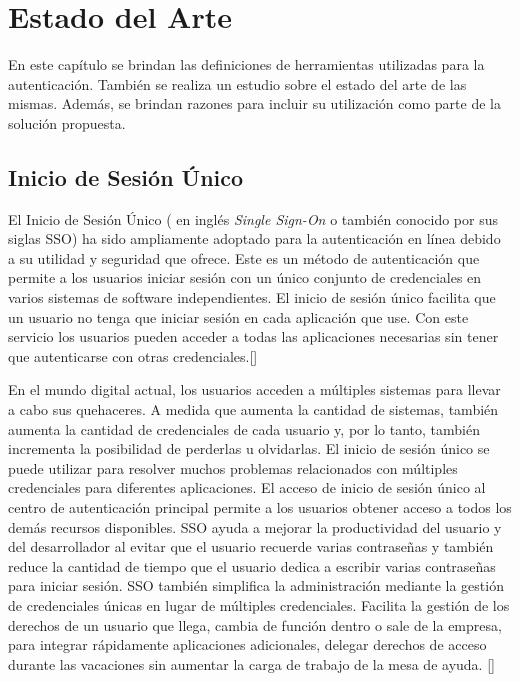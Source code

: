 

\chapter{Estado del Arte}\label{chapter:state-of-the-art}
En este capítulo se brindan las definiciones de herramientas utilizadas para la autenticación. También se realiza un estudio sobre el estado del arte de las mismas. Además, se brindan razones para incluir su utilización como parte de la solución propuesta.

\section{Inicio de Sesión Único}
El Inicio de Sesión Único ( en inglés \textit{Single Sign-On} o también conocido por sus siglas SSO) ha sido ampliamente adoptado para la autenticación en línea debido a su utilidad y seguridad que ofrece. Este es un método de autenticación que permite a los usuarios iniciar sesión con un único conjunto de credenciales en varios sistemas de software independientes. El inicio de sesión único facilita que un usuario no tenga que iniciar sesión en cada aplicación que use. Con este servicio los usuarios pueden acceder a todas las aplicaciones necesarias sin tener que autenticarse con otras credenciales.[\cite{microsoft-doc}]

En el mundo digital actual, los usuarios acceden a múltiples sistemas para llevar a cabo sus quehaceres. A medida que aumenta la cantidad de sistemas, también aumenta la cantidad de credenciales de cada usuario y, por lo tanto, también incrementa la posibilidad de perderlas u olvidarlas. El inicio de sesión único se puede utilizar para resolver muchos problemas relacionados con múltiples credenciales para diferentes aplicaciones. El acceso de inicio de sesión único al centro de autenticación principal permite a los usuarios obtener acceso a todos los demás recursos disponibles. SSO ayuda a mejorar la productividad del usuario y del desarrollador al evitar que el usuario recuerde varias contraseñas y también reduce la cantidad de tiempo que el usuario dedica a escribir varias contraseñas para iniciar sesión. SSO también simplifica la administración mediante la gestión de credenciales únicas en lugar de múltiples credenciales. Facilita la gestión de los derechos de un usuario que llega, cambia de función dentro o sale de la empresa, para integrar rápidamente aplicaciones adicionales, delegar derechos de acceso durante las vacaciones sin aumentar la carga de trabajo de la mesa de ayuda. [\cite{radha2012survey}]

